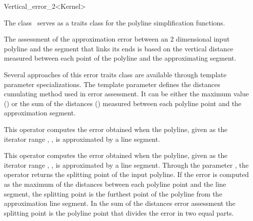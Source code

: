 
\begin{ccRefClass}{Vertical_error_2<Kernel>}

\ccDefinition
  
The class \ccRefName\ serves as a traits class for the polyline
simplification functions.

The assessment of the approximation error between an 2 dimensional
input polyline and the segment that links its ends is based on the
vertical distance measured between each point of the polyline and the
approximating segment.

Several approaches of this error traits class are available through
template parameter specializations. The  template parameter
defines the distances cumulating method used in error assessment.
It can be either the maximum value () or the sum of the distances
() measured between each polyline point and the approximation segment.




\ccIsModel



\ccTypes


\ccOperations

{This operator computes the error obtained when the polyline, given as the iterator range , , 
is approximated by a line segment.}

{This operator computes the error obtained when the polyline, given as the iterator range , ,
is approximated by a line segment. Through the parameter , the operator returns the 
splitting point of the input polyline.  
If the error is computed as the maximum of the distances between each
polyline point and the line segment, the splitting point is the furthest
point of the polyline from the approximation line segment. In the sum of
the distances error assessment the splitting point is the polyline point
that divides the error in two equal parts. }


\ccSeeAlso


\end{ccRefClass}

